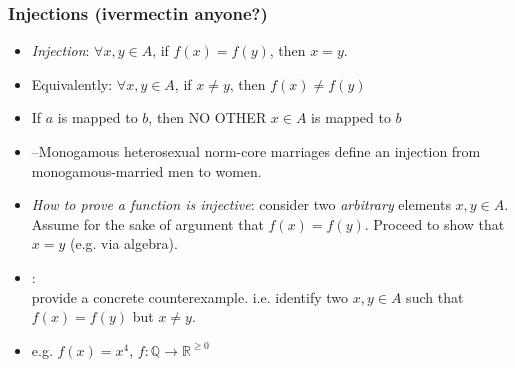 \begin{frame}
\frametitle{Injections (ivermectin anyone?)}

\begin{itemize}[<+->]

\item \emph{Injection}: $\forall x, y \in A$, if $f(x) = f(y)$, then $x = y$.
\item[] Equivalently: $\forall x, y \in A$, if $x \neq y$, then $f(x) \neq f(y)$
\item[] If $a$ is mapped to $b$, then NO OTHER $x \in A$ is mapped to $b$
\item[] --Monogamous heterosexual norm-core marriages define an injection from monogamous-married men to women. 

\item  \emph{How to prove a function is injective}: consider two \textit{arbitrary} elements $x, y \in A$. Assume for the sake of argument that $f(x) = f(y)$. Proceed to show that $x=y$ (e.g. via algebra).

\item {}: \\ provide a concrete counterexample. i.e. identify two $x, y \in A$ such that $f(x) = f(y)$ but $x \neq y$.
\item[] e.g. $f(x) = x^4$, $f: \mathbb{Q} \rightarrow \mathbb{R}^{\geq 0}$

\end{itemize}
\end{frame}

